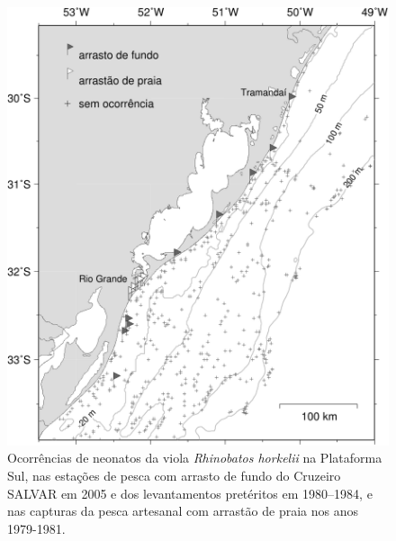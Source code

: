 \documentclass[a4paper,11pt,twoside,showtrims,onecolumn,openright,final]{memoir}
\begin{document}
\begin{figure}
\begin{center}
\includegraphics[width=\textwidth]{VIOLA_MAPA_NEONATOS}
\end{center}
\caption[Ocorrências de neonatos da viola \emph{Rhinobatos horkelii} na Plataforma Sul]
	{Ocorrências de neonatos da viola \emph{Rhinobatos horkelii} na Plataforma Sul, 
	 nas estações de pesca com arrasto de fundo do Cruzeiro SALVAR em 2005 e 
	 dos levantamentos pretéritos em 1980--1984, e nas capturas da pesca artesanal 
	 com arrastão de praia nos anos 1979-1981.}
\label{fig:viola-mapa-neonatos}
\end{figure}

\end{document}
